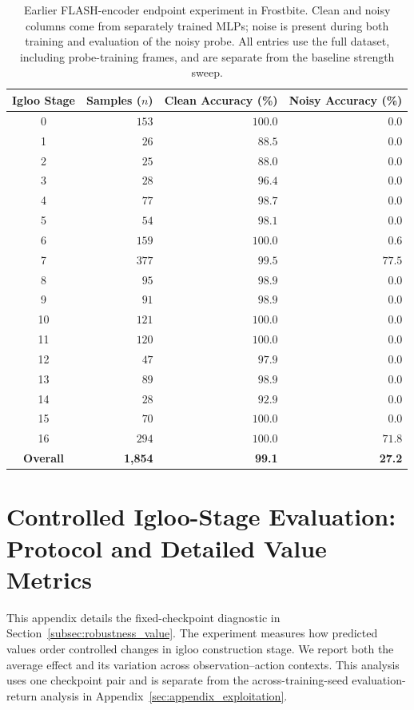 \documentclass{article} %
\begin{document}
\begin{table}[!t]
    \centering
    \caption{Earlier FLASH-encoder endpoint experiment in Frostbite. Clean and noisy columns come from separately trained MLPs; noise is present during both training and evaluation of the noisy probe. All entries use the full dataset, including probe-training frames, and are separate from the baseline strength sweep.}
    \label{tab:per_class_noise_flash}
    \begin{tabular}{crrr}
        \toprule
        \textbf{Igloo Stage} & \textbf{Samples ($n$)} & \textbf{Clean Accuracy (\%)} & \textbf{Noisy Accuracy (\%)} \\
        \midrule
        0 & $153$ & $100.0$ & $0.0$ \\
        1 & $26$ & $88.5$ & $0.0$ \\
        2 & $25$ & $88.0$ & $0.0$ \\
        3 & $28$ & $96.4$ & $0.0$ \\
        4 & $77$ & $98.7$ & $0.0$ \\
        5 & $54$ & $98.1$ & $0.0$ \\
        6 & $159$ & $100.0$ & $0.6$ \\
        7 & $377$ & $99.5$ & $77.5$ \\
        8 & $95$ & $98.9$ & $0.0$ \\
        9 & $91$ & $98.9$ & $0.0$ \\
        10 & $121$ & $100.0$ & $0.0$ \\
        11 & $120$ & $100.0$ & $0.0$ \\
        12 & $47$ & $97.9$ & $0.0$ \\
        13 & $89$ & $98.9$ & $0.0$ \\
        14 & $28$ & $92.9$ & $0.0$ \\
        15 & $70$ & $100.0$ & $0.0$ \\
        16 & $294$ & $100.0$ & $71.8$ \\
        \midrule
        \textbf{Overall} & \textbf{1,854} & \textbf{99.1} & \textbf{27.2} \\
        \bottomrule
    \end{tabular}
\end{table}

\section{Controlled Igloo-Stage Evaluation: Protocol and Detailed Value Metrics}
\label{sec:appendix_value_robustness}
This appendix details the fixed-checkpoint diagnostic in Section~\ref{subsec:robustness_value}. The experiment measures how predicted values order controlled changes in igloo construction stage. We report both the average effect and its variation across observation--action contexts. This analysis uses one checkpoint pair and is separate from the across-training-seed evaluation-return analysis in Appendix~\ref{sec:appendix_exploitation}.
\end{document}
